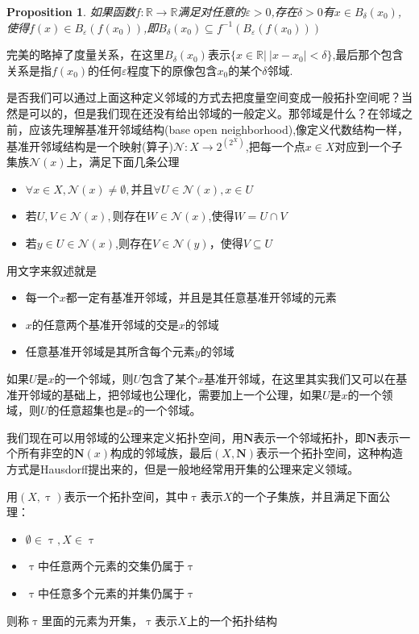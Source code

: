 \documentclass{article}
\newtheorem{proposition}[theorem]{Proposition}
\newcommand*{\xfunc}[4]{{#2}\colon{#3}{#1}{#4}}
\newcommand*{\func}[3]{\xfunc{\to}{#1}{#2}{#3}}
\begin{document}
\begin{proposition}
如果函数$\func{f}{\mathbb{R}}{\mathbb{R}}$满足对任意的$\varepsilon > 0$,存在$\delta > 0$有$x \in B_{\delta}(x_0)$,使得$f(x) \in B_{\varepsilon}(f(x_0))$,即$B_{\delta}(x_0) \subseteq f^{-1}(B_{\varepsilon}(f(x_0)))$
\end{proposition}

完美的略掉了度量关系，在这里$B_{\delta}(x_0)$表示$\{x \in \mathbb{R} |\ |x-x_0| < \delta \}$,最后那个包含关系是指$f(x_0)$的任何$\varepsilon$程度下的原像包含$x_0$的某个$\delta$邻域.

是否我们可以通过上面这种定义邻域的方式去把度量空间变成一般拓扑空间呢？当然是可以的，但是我们现在还没有给出邻域的一般定义。那邻域是什么？在邻域之前，应该先理解基准开邻域结构(base open neighborhood),像定义代数结构一样，基准开邻域结构是一个映射(算子)$\func{\mathcal{N}}{X}{2^(2^X)}$,把每一个点$x \in X$对应到一个子集族$\mathcal{N}(x)$上，满足下面几条公理
		\begin{itemize}
			\item $\forall x \in X,\mathcal{N}(x) \neq \emptyset,$并且$\forall U \in \mathcal{N}(x),x \in U$
			\item 若$U,V \in \mathcal{N}(x),$则存在$W \in \mathcal{N}(x)$,使得$W = U \cap V$
			\item 若$y \in U \in \mathcal{N}(x)$,则存在$V \in \mathcal{N}(y)$，使得$V \subseteq U$
		\end{itemize}
用文字来叙述就是
		\begin{itemize}
			\item 每一个$x$都一定有基准开邻域，并且是其任意基准开邻域的元素
			\item $x$的任意两个基准开邻域的交是$x$的邻域
			\item 任意基准开邻域是其所含每个元素$y$的邻域
		\end{itemize}
如果$U$是$x$的一个邻域，则$U$包含了某个$x$基准开邻域，在这里其实我们又可以在基准开邻域的基础上，把邻域也公理化，需要加上一个公理，如果$U$是$x$的一个领域，则$U$的任意超集也是$x$的一个邻域。

我们现在可以用邻域的公理来定义拓扑空间，用$\mathbf{N}$表示一个邻域拓扑，即$\mathbf{N}$表示一个所有非空的$\mathbf{N}(x)$构成的邻域族，最后$(X,\mathbf{N})$表示一个拓扑空间，这种构造方式是Hausdorff提出来的，但是一般地经常用开集的公理来定义领域。

用$(X,\uptau)$表示一个拓扑空间，其中$\uptau$表示$X$的一个子集族，并且满足下面公理：
\begin{itemize}
	\item $\emptyset \in \uptau,X \in \uptau$
	\item $\uptau$中任意两个元素的交集仍属于$\uptau$
	\item $\uptau$中任意多个元素的并集仍属于$\uptau$
\end{itemize}	
则称$\uptau$里面的元素为开集，$\uptau$表示$X$上的一个拓扑结构
\end{document}
